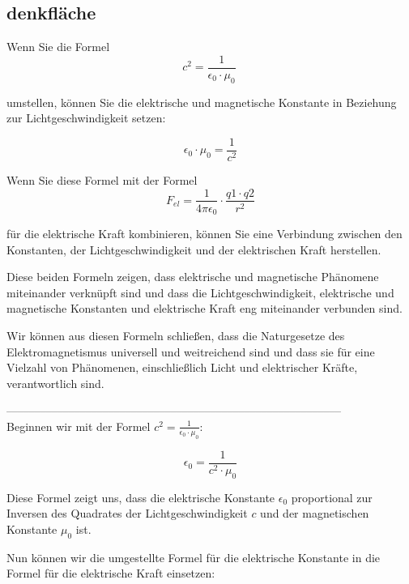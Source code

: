 \documentclass{report}
\begin{document}
\clearpage
\subsection{denkfläche}
Wenn Sie die Formel 
\begin{equation}
c^2 = \frac{1}{\epsilon_0 \cdot \mu_0}\
  \label{eq:wasdklfj}
\end{equation}

umstellen, können
Sie die elektrische und magnetische Konstante in Beziehung zur
Lichtgeschwindigkeit setzen:

\begin{equation}
\epsilon_0 \cdot \mu_0 = \frac{1}{c^2}
  \label{eq:weis-nicht}
\end{equation}


Wenn Sie diese Formel mit der Formel 
\begin{equation}
F_{el} = \frac{1}{4\pi \epsilon_0} \cdot \frac{q1 \cdot q2}{r^2}
\end{equation}

für die elektrische Kraft kombinieren, können Sie eine
Verbindung zwischen den Konstanten, der Lichtgeschwindigkeit und der
elektrischen Kraft herstellen.

Diese beiden Formeln zeigen, dass elektrische und magnetische Phänomene
miteinander verknüpft sind und dass die Lichtgeschwindigkeit, elektrische und
magnetische Konstanten und elektrische Kraft eng miteinander verbunden sind.

Wir können aus diesen Formeln schließen, dass die Naturgesetze des
Elektromagnetismus universell und weitreichend sind und dass sie für eine
Vielzahl von Phänomenen, einschließlich Licht und elektrischer Kräfte,
verantwortlich sind.

–––––––––––––––––––––––––––––––––––––––––––––––––––––––––––\\
Beginnen wir mit der Formel $c^2 = \frac{1}{\epsilon_0 \cdot \mu_0}$:

\begin{equation}
\epsilon_0 = \frac{1}{c^2 \cdot \mu_0}
\end{equation}


Diese Formel zeigt uns, dass die elektrische Konstante $\epsilon_0$ proportional zur
Inversen des Quadrates der Lichtgeschwindigkeit $c$ und der magnetischen
Konstante $\mu_0$ ist.

Nun können wir die umgestellte Formel für die elektrische Konstante in die
Formel für die elektrische Kraft einsetzen:
\end{document}
